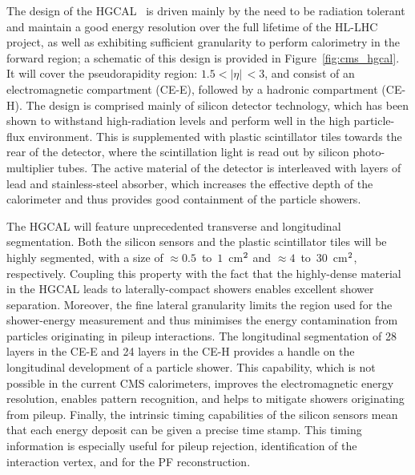 The design of the HGCAL~\cite{CERN-LHCC-2017-023} is driven mainly by the need to be radiation tolerant and maintain a good energy resolution over the full lifetime of the HL-LHC project, as well as exhibiting sufficient granularity to perform calorimetry in the forward region; a schematic of this design is provided in Figure~\ref{fig:cms_hgcal}. It will cover the pseudorapidity region: $1.5<|\eta|\,<3$, and  consist of an electromagnetic compartment (CE-E), followed by a hadronic compartment (CE-H). The design is comprised mainly of silicon detector technology, which has been shown to withstand high-radiation levels and perform well in the high particle-flux environment. This is supplemented with plastic scintillator tiles towards the rear of the detector, where the scintillation light is read out by silicon photo-multiplier tubes. The active material of the detector is interleaved with layers of lead and stainless-steel absorber, which increases the effective depth of the calorimeter and thus provides good containment of the particle showers.

The HGCAL will feature unprecedented transverse and longitudinal segmentation. Both the silicon sensors and the plastic scintillator tiles will be highly segmented, with a size of $\approx0.5$~to~$1$~cm$^{\rm{2}}$ and $\approx4$~to~$30$~cm$^{\rm{2}}$, respectively. Coupling this property with the fact that the highly-dense material in the HGCAL leads to laterally-compact showers enables excellent shower separation. Moreover, the fine lateral granularity limits the region used for the shower-energy measurement and thus minimises the energy contamination from particles originating in pileup interactions. The longitudinal segmentation of 28 layers in the CE-E and 24 layers in the CE-H provides a handle on the longitudinal development of a particle  shower. This capability, which is not possible in the current CMS calorimeters, improves the electromagnetic energy resolution, enables pattern recognition, and helps to mitigate showers originating from pileup. Finally, the intrinsic timing capabilities of the silicon sensors mean that each energy deposit can be given a precise time stamp. This timing information is especially useful for pileup rejection, identification of the interaction vertex, and for the PF reconstruction.


